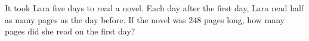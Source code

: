 It took Lara five days to read a novel. Each day after the first day, Lara read half as many pages as the day before. If the novel was $248$ pages long, how many pages did she read on the first day?
